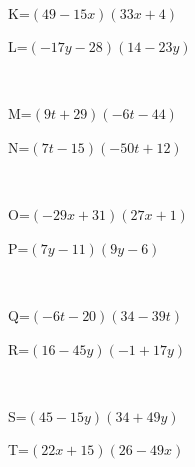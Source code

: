 \documentclass{article}%
\begin{document}
\\%
\begin{minipage}{0.5\textwidth}%
K=$(49-15x)(33x+4)$\\%
\end{minipage}%
\begin{minipage}{0.5\textwidth}%
L=$(-17y-28)(14-23y)$\\%
\end{minipage}%
\\%
\begin{minipage}{0.5\textwidth}%
M=$(9t+29)(-6t-44)$\\%
\end{minipage}%
\begin{minipage}{0.5\textwidth}%
N=$(7t-15)(-50t+12)$\\%
\end{minipage}%
\\%
\begin{minipage}{0.5\textwidth}%
O=$(-29x+31)(27x+1)$\\%
\end{minipage}%
\begin{minipage}{0.5\textwidth}%
P=$(7y-11)(9y-6)$\\%
\end{minipage}%
\\%
\begin{minipage}{0.5\textwidth}%
Q=$(-6t-20)(34-39t)$\\%
\end{minipage}%
\begin{minipage}{0.5\textwidth}%
R=$(16-45y)(-1+17y)$\\%
\end{minipage}%
\\%
\begin{minipage}{0.5\textwidth}%
S=$(45-15y)(34+49y)$\\%
\end{minipage}%
\begin{minipage}{0.5\textwidth}%
T=$(22x+15)(26-49x)$\\%
\end{minipage}%
\\

%
\newpage%
\end{document}
